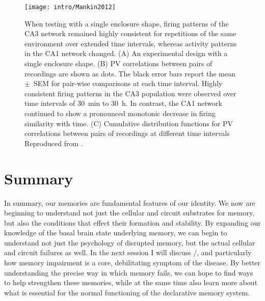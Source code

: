\begin{figure}
	\centering
	\texttt{[image: intro/Mankin2012]}
	\caption[Place cell population stability over days]{
		When testing with a single enclosure shape, firing patterns of the CA3 network remained highly consistent for repetitions of the same environment over extended time intervals, whereas activity patterns in the CA1 network changed.
		(A) An experimental design with a single enclosure shape.
		(B) PV correlations between pairs of recordings are shown as dots. The black error bars report the mean~$\pm$~SEM for pair-wise comparisons at each time interval.
		Highly consistent firing patterns in the CA3 population were observed over time intervals of 30~min to 30~h. In contrast, the CA1 network continued to show a pronounced monotonic decrease in firing similarity with time.
		(C) Cumulative distribution functions for PV correlations between pairs of recordings at different time intervals
	Reproduced from \citet{Mankin2012}.}
	\label{fig:intro:memory:time_stability}
\end{figure}

\section{Summary}
In summary, our memories are fundamental features of our identity.
We now are beginning to understand not just the cellular and circuit substrates for memory, but also the conditions that effect their formation and stability.
By expanding our knowledge of the basal brain state underlying memory, we can begin to understand not just the psychology of disrupted memory, but the actual cellular and circuit failures as well.
In the next session I will discuss \scz/, and particularly how memory impairment is a core, debilitating symptom of the disease.
By better understanding the precise way in which memory fails, we can hope to find ways to help strengthen these memories, while at the same time also learn more about what is essential for the normal functioning of the declarative memory system.


